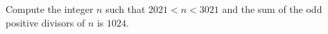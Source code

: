 Compute the integer $n$ such that $2021<n<3021$ and the sum of the odd positive divisors of $n$ is $1024$.
